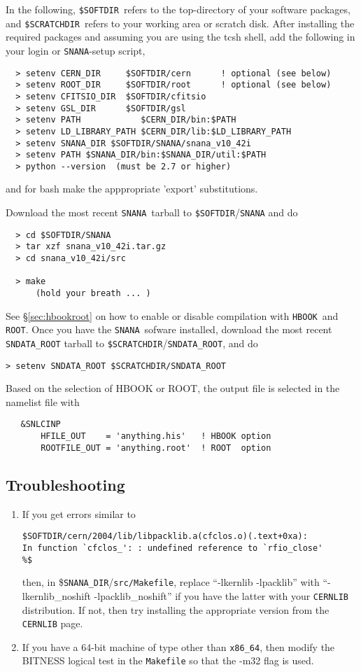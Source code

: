 \documentclass[12pt]{article}
\newcommand{\snana}{{\tt SNANA}}
\newcommand{\snanadir}{{\tt SNANA\_DIR}}
\newcommand{\sndataroot}{{\tt SNDATA\_ROOT}}
\newcommand{\softdir}{{\tt \$SOFTDIR}}
\newcommand{\workdir}{{\tt \$SCRATCHDIR}}
\newcommand{\ROOT}{{\tt ROOT}}
\newcommand{\HBOOK}{{\tt HBOOK}}
\begin{document}
In the following, \softdir\ refers to the top-directory
of your software packages,
and \workdir\ refers to your working area or scratch disk.
After installing the required packages and assuming you
are using the tcsh shell, add the following in your
login or {\snana}-setup script,
%
\begin{verbatim}
  > setenv CERN_DIR     $SOFTDIR/cern      ! optional (see below)
  > setenv ROOT_DIR     $SOFTDIR/root      ! optional (see below)
  > setenv CFITSIO_DIR  $SOFTDIR/cfitsio 
  > setenv GSL_DIR      $SOFTDIR/gsl
  > setenv PATH            $CERN_DIR/bin:$PATH 
  > setenv LD_LIBRARY_PATH $CERN_DIR/lib:$LD_LIBRARY_PATH 
  > setenv SNANA_DIR $SOFTDIR/SNANA/snana_v10_42i 
  > setenv PATH $SNANA_DIR/bin:$SNANA_DIR/util:$PATH
  > python --version  (must be 2.7 or higher)
\end{verbatim}
and for bash make the apppropriate 'export' substitutions.


\noindent
Download the most recent \snana\ tarball to
{\softdir/\snana} and do
%
\begin{verbatim}
  > cd $SOFTDIR/SNANA
  > tar xzf snana_v10_42i.tar.gz 
  > cd snana_v10_42i/src 

  > make   
      (hold your breath ... )
\end{verbatim}
%
See \S\ref{sec:hbookroot} on how to enable or disable
compilation with \HBOOK\ and \ROOT.
Once you have the \snana\ sofware installed,
download the most recent {\sndataroot} tarball to 
{\workdir}/{\sndataroot}, and do
%
\begin{verbatim}
> setenv SNDATA_ROOT $SCRATCHDIR/SNDATA_ROOT
\end{verbatim}
Based on the selection of HBOOK or ROOT,
the output file is selected in the namelist file with
\begin{verbatim}
   &SNLCINP
       HFILE_OUT    = 'anything.his'   ! HBOOK option
       ROOTFILE_OUT = 'anything.root'  ! ROOT  option
\end{verbatim}

\clearpage
\subsection{Troubleshooting}

\begin{enumerate}
\item 	If you get errors similar to 
\begin{verbatim}
$SOFTDIR/cern/2004/lib/libpacklib.a(cfclos.o)(.text+0xa): 
In function `cfclos_': : undefined reference to `rfio_close' 
%$
\end{verbatim}
%
  	then, in {\$\snanadir}/{\tt src/Makefile}, replace
  	``-lkernlib -lpacklib''  with
  	``-lkernlib\_noshift -lpacklib\_noshift''
%
  	if you have the latter with your {\tt CERNLIB} distribution. 
	If not, then try installing the appropriate version from the 
	{\tt CERNLIB} page. 
%
\item	If you have a 64-bit machine of type other than {\tt x86\_64}, 
   	then modify the BITNESS logical test in the {\tt Makefile} so 
   	that the  -m32 flag is used.
\end{enumerate}
\end{document}
